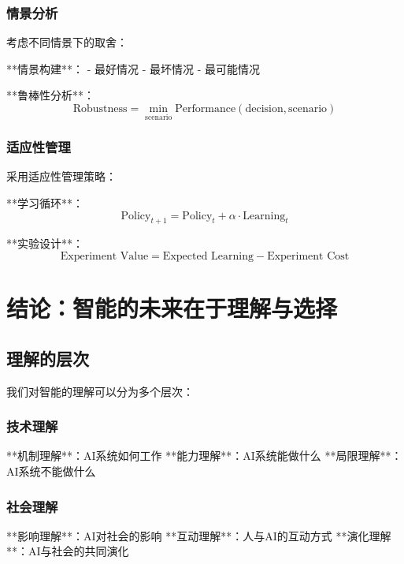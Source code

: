 \subsubsection{情景分析}

考虑不同情景下的取舍：

**情景构建**：
- 最好情况
- 最坏情况
- 最可能情况

**鲁棒性分析**：
\begin{equation}
\text{Robustness} = \min_{\text{scenario}} \text{Performance}(\text{decision}, \text{scenario})
\end{equation}

\subsubsection{适应性管理}

采用适应性管理策略：

**学习循环**：
\begin{equation}
\text{Policy}_{t+1} = \text{Policy}_t + \alpha \cdot \text{Learning}_t
\end{equation}

**实验设计**：
\begin{equation}
\text{Experiment Value} = \text{Expected Learning} - \text{Experiment Cost}
\end{equation}

\section{结论：智能的未来在于理解与选择}

\subsection{理解的层次}

我们对智能的理解可以分为多个层次：

\subsubsection{技术理解}

**机制理解**：AI系统如何工作
**能力理解**：AI系统能做什么
**局限理解**：AI系统不能做什么

\subsubsection{社会理解}

**影响理解**：AI对社会的影响
**互动理解**：人与AI的互动方式
**演化理解**：AI与社会的共同演化

